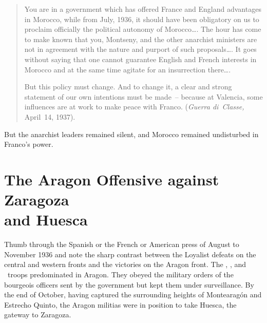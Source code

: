 \indexCNT{}
\begin{quotation}
  You are in a government which has offered France and England advantages in Morocco, while from July, 1936, it should have been obligatory on us to proclaim officially the political autonomy of Morocco\dots.
  The hour has come to make known that you, Montseny, and the other anarchist ministers are not in agreement with the nature and purport of such proposals\dots.
  It goes without saying that one cannot guarantee English and French interests in Morocco and at the same time agitate for an insurrection there\dots.
  
  But this policy must change. And to change it, a clear and strong statement of our own intentions must be made~-- because at Valencia, some influences are at work to make peace with Franco. (\emph{Guerra di~Classe,} April~14, 1937). 
\end{quotation}

But the anarchist leaders remained silent, and Morocco remained undisturbed in Franco’s power.%

\section[The Aragon Offensive against Zaragoza and Huesca]{The Aragon Offensive against Zaragoza \\ and Huesca}

Thumb through the Spanish or the French or American press of August to November 1936 and note the sharp contrast between the Loyalist defeats on the central and western fronts and the victories on the Aragon front. The \CNT\kn, \FAI, and \POUM\ troops predominated in Aragon. They obeyed the military orders of the bourgeois officers sent by the government but kept them under surveillance. By the end of October, having captured the surrounding heights of Montearagón and Estrecho Quinto, the Aragon militias were in position to take Huesca, the gateway to Zaragoza.

